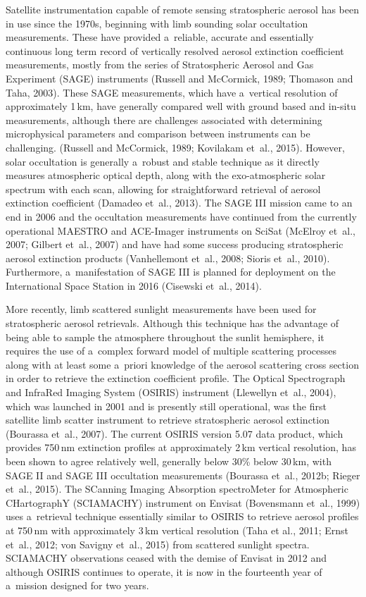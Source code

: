 \documentclass[amtd, online, hvmath]{copernicus}
\begin{document}
Satellite instrumentation capable of remote sensing stratospheric
aerosol has been in use since the 1970s, beginning with limb sounding
solar occultation measurements. These have provided a~reliable,
accurate and essentially continuous long term record of vertically
resolved aerosol extinction coefficient measurements, mostly from the
series of Stratospheric Aerosol and Gas Experiment (SAGE) instruments
(Russell and McCormick, 1989; Thomason and Taha, 2003). These SAGE
measurements, which have a~vertical resolution of approximately
1\,\unit{km}, have generally compared well with ground based and
in-situ measurements, although there are challenges associated with
determining microphysical
parameters and comparison between instruments can be challenging. (Russell and McCormick, 1989; Kovilakam et~al.,
2015). However, solar occultation is generally a~robust and stable
technique as it directly measures atmospheric optical depth, along
with the exo-atmospheric solar spectrum with each scan, allowing for
straightforward retrieval of aerosol extinction coefficient (Damadeo
et~al., 2013). The SAGE III mission came to an end in 2006 and the occultation measurements have continued from the currently operational MAESTRO and
ACE-Imager instruments on SciSat (McElroy et~al., 2007; Gilbert
et~al., 2007) and have had some success producing stratospheric aerosol
extinction products (Vanhellemont et~al., 2008; Sioris et~al., 2010).
Furthermore, a~manifestation of SAGE III is planned
for deployment on the International Space Station in 2016 (Cisewski
et~al., 2014).

More recently, limb scattered sunlight measurements have been used for
stratospheric aerosol retrievals. Although this technique has the
advantage of being able to sample the atmosphere throughout the sunlit
hemisphere, it requires the use of a~complex forward model of multiple
scattering processes along with at least some a~priori knowledge of
the aerosol scattering cross section in order to retrieve the
extinction coefficient profile. The Optical Spectrograph and InfraRed
Imaging System (OSIRIS) instrument (Llewellyn et~al., 2004), which was
launched in 2001 and is presently still operational, was the first
satellite limb scatter instrument to retrieve stratospheric aerosol
extinction (Bourassa et~al., 2007). The current OSIRIS version 5.07
data product, which provides 750\,\unit{nm} extinction profiles at
approximately 2\,\unit{km} vertical resolution, has been shown to
agree relatively well, generally below 30\% below 30\,\unit{km}, with SAGE II and SAGE III occultation
measurements  (Bourassa et~al., 2012b; Rieger et~al., 2015). The
SCanning Imaging Absorption spectroMeter for Atmospheric CHartographY
(SCIAMACHY) instrument on Envisat (Bovensmann et~al., 1999) uses
a~retrieval technique essentially similar to OSIRIS to retrieve
aerosol profiles at 750\,\unit{nm} with approximately 3\,\unit{km}
vertical resolution (Taha et al., 2011; Ernst et~al., 2012; von Savigny et~al., 2015)
from scattered sunlight spectra.  SCIAMACHY observations ceased with
the demise of Envisat in 2012 and although OSIRIS continues to
operate, it is now in the fourteenth year of a~mission designed for
two years.
\end{document}
